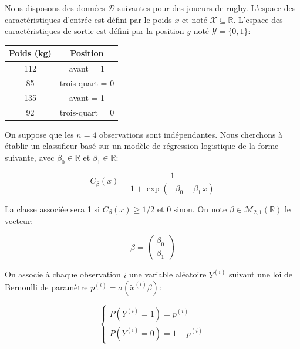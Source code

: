 \documentclass[solutions]{../exercices}
\begin{document}
\begin{exercice}
Nous disposons des données $\mathcal{D}$ suivantes pour des joueurs de rugby. L'espace des caractéristiques d'entrée est défini par le poids $x$ et noté $\mathcal{X} \subseteq \mathbb{R}$. L'espace des caractéristiques de sortie est défini par la position $y$ noté $\mathcal{Y} = \{0, 1\}$:

\begin{center}
	\begin{tabular}{|c|c|}
		\hline
		\textbf{Poids} (kg) & \textbf{Position} \\ \hline
		112 &  avant = 1       \\
		85  &  trois-quart = 0 \\
		135 &  avant = 1       \\
		92  &  trois-quart = 0 \\
		\hline
	\end{tabular}
\end{center}

On suppose que les $n = 4$ observations sont indépendantes. Nous cherchons à établir un classifieur basé sur un modèle de régression logistique de la forme suivante, avec $\beta_0 \in \mathbb{R}$ et $\beta_1 \in \mathbb{R}$:

\begin{equation}
	C_{\beta}(x) = \frac{1}{1 + \exp{\left(- \beta_0 - \beta_1 \, x\right)}}
	\nonumber
\end{equation}

La classe associée sera 1 si $C_{\beta}(x) \ge 1/2$ et 0 sinon. On note $\beta \in \mathcal{M}_{2,1}(\mathbb{R})$ le vecteur:

\begin{equation}
	\beta = \begin{pmatrix}\beta_0 \\ \beta_1\end{pmatrix}
	\nonumber
\end{equation}

On associe à chaque observation $i$ une variable aléatoire $Y^{(i)}$ suivant une loi de Bernoulli de paramètre $p^{(i)} = \sigma(\tilde{x}^{(i)} \beta)$:

\begin{equation}
	\begin{cases}
		P(Y^{(i)} = 1) = p^{(i)} \\
		P(Y^{(i)} = 0) = 1 - p^{(i)}
	\end{cases}
	\nonumber
\end{equation}


\end{exercice}
\end{document}
